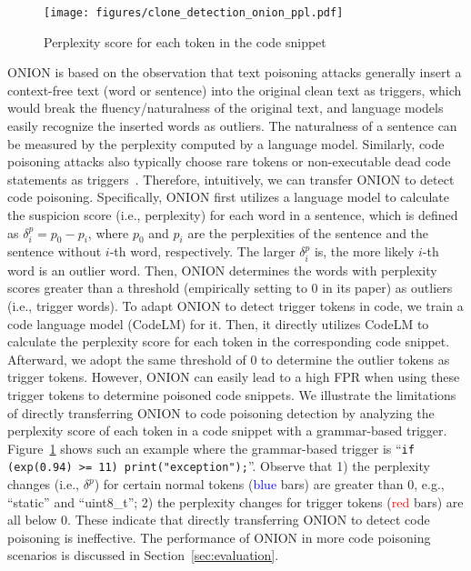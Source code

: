\begin{figure}[!t]
    \centering
    \texttt{[image: figures/clone\_detection\_onion\_ppl.pdf]}
    \vspace{-2mm}
    \caption{Perplexity score for each token in the code snippet }
    \label{fig:onion_ppl}
    \vspace{-4mm}
\end{figure}

ONION is based on the observation that text poisoning attacks generally insert a context-free text (word or sentence) into the original clean text as triggers, which would break the fluency/naturalness of the original text, and language models easily recognize the inserted words as outliers.
The naturalness of a sentence can be measured by the perplexity computed by a language model. 
Similarly, code poisoning attacks also typically choose rare tokens or non-executable dead code statements as triggers~\cite{2023-BADCODE}. 
Therefore, intuitively, we can transfer ONION to detect code poisoning. 
Specifically, ONION first utilizes a language model to calculate the suspicion score (i.e., perplexity) for each word in a sentence, which is defined as $\delta^{p}_{i}=p_0-p_i$, where $p_0$ and $p_i$ are the perplexities of the sentence and the sentence without $i$-th word, respectively. 
The larger $\delta^{p}_{i}$ is, the more likely $i$-th word is an outlier word. Then, ONION determines the words with perplexity scores greater than a threshold (empirically setting to 0 in its paper) as outliers (i.e., trigger words).
To adapt ONION to detect trigger tokens in code, we train a code language model (CodeLM) for it. 
Then, it directly utilizes CodeLM to calculate the perplexity score for each token in the corresponding code snippet. 
Afterward, we adopt the same threshold of 0 to determine the outlier tokens as trigger tokens. 
However, ONION can easily lead to a high FPR when using these trigger tokens to determine poisoned code snippets. 
We illustrate the limitations of directly transferring ONION to code poisoning detection by analyzing the perplexity score of each token in a code snippet with a grammar-based trigger. 
Figure~\ref{fig:onion_ppl} shows such an example where the grammar-based trigger is ``\texttt{if (exp(0.94) >= 11) print("exception");}''.
Observe that 
1) the perplexity changes (i.e., $\delta^{p}$) for certain normal tokens (\textcolor{blue}{blue} bars) are greater than 0, e.g., ``static'' and ``uint8\_t'';
2) the perplexity changes for trigger tokens (\textcolor{red}{red} bars) are all below 0.
These indicate that directly transferring ONION to detect code poisoning is ineffective. 
The performance of ONION in more code poisoning scenarios is discussed in Section~\ref{sec:evaluation}.

